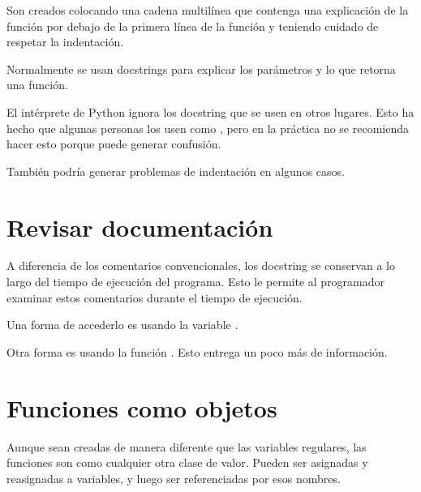Son creados colocando una cadena multilínea que contenga una explicación de la función por debajo de la primera línea de la función y teniendo cuidado de respetar la indentación.


Normalmente se usan docstrings para explicar los parámetros y lo que retorna una función.


El intérprete de Python ignora los docstring que se usen en otros lugares.
Esto ha hecho que algunas personas los usen como , pero en la práctica no se recomienda hacer esto porque puede generar confusión.


También podría generar problemas de indentación en algunos casos.

\section{Revisar documentación} %

A diferencia de los comentarios convencionales, los docstring se conservan a lo largo del tiempo de ejecución del programa.
Esto le permite al programador examinar estos comentarios durante el tiempo de ejecución.

Una forma de accederlo es usando la variable .


Otra forma es usando la función .
Esto entrega un poco más de información.


\section{Funciones como objetos}

Aunque sean creadas de manera diferente que las variables regulares, las funciones son como cualquier otra clase de valor.
Pueden ser asignadas y reasignadas a variables, y luego ser referenciadas por esos nombres.


